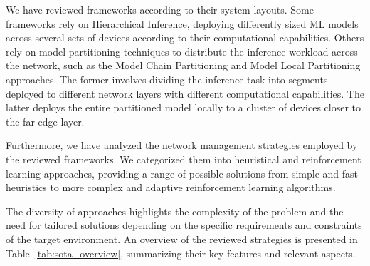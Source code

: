 We have reviewed frameworks according to their system layouts. Some frameworks rely
on Hierarchical Inference, deploying differently sized \ac{ML} models across several
sets of devices according to their computational capabilities. Others rely on model
partitioning techniques to distribute the inference workload across the network, such
as the Model Chain Partitioning and Model Local Partitioning approaches. The former
involves dividing the inference task into segments deployed to different network
layers with different computational capabilities. The latter deploys the entire
partitioned model locally to a cluster of devices closer to the
far-edge layer.

Furthermore, we have analyzed the network management strategies employed by
the reviewed frameworks. We categorized them into heuristical and reinforcement
learning approaches, providing a range of possible solutions from simple and fast
heuristics to more complex and adaptive reinforcement learning algorithms.

The diversity of approaches highlights the complexity of the problem and the
need for tailored solutions depending on the specific requirements and constraints
of the target environment. An overview of the reviewed strategies is presented
in Table~\ref{tab:sota_overview}, summarizing their key features and relevant
aspects.

